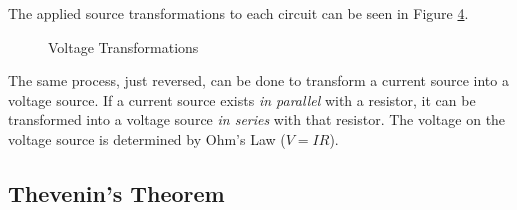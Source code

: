 \documentclass[12pt]{article}
\begin{document}
The applied source transformations to each circuit can be seen in Figure \ref{fig:voltageTransformationsAfter}.

\begin{figure}[H]
  \centering
  \begin{subfigure}[H]{0.3\textwidth}
    \centering
    
    \caption{}
    \label{fig:037}
  \end{subfigure}
  \begin{subfigure}[H]{0.3\textwidth}
    \centering
    
    \caption{}
    \label{fig:038}
  \end{subfigure}
  \begin{subfigure}[H]{0.3\textwidth}
    \centering
    
    \caption{}
    \label{fig:039}
  \end{subfigure}
  \caption{Voltage Transformations}
  \label{fig:voltageTransformationsAfter}
\end{figure}

The same process, just reversed, can be done to transform a current source into a voltage source. If a current source exists \textit{in parallel} with a resistor, it can be transformed into a voltage source \textit{in series} with that resistor. The voltage on the voltage source is determined by Ohm's Law ($V = IR$).

\subsection{Thevenin's Theorem}
\label{ssec:theveninsTheorem}
\end{document}
